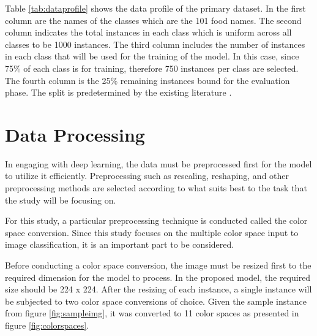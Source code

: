 Table \ref{tab:dataprofile} shows the data profile of the primary dataset. In the first column are the names of the classes which are the 101 food names. The second column indicates the total instances in each class which is uniform across all classes to be 1000 instances. The third column includes the number of instances in each class that will be used for the training of the model. In this case, since 75\% of each class is for training, therefore 750 instances per class are selected. The fourth column is the 25\%  remaining instances bound for the evaluation phase. The split is predetermined by the existing literature \cite{bossard-2014}. 



\section{Data Processing}
In engaging with deep learning, the data must be preprocessed first for the model to utilize it efficiently. Preprocessing such as rescaling, reshaping, and other preprocessing methods are selected according to what suits best to the task that the study will be focusing on.

For this study, a particular preprocessing technique is conducted called the color space conversion. Since this study focuses on the multiple color space input to image classification, it is an important part to be considered.

Before conducting a color space conversion, the image must be resized first to the required dimension for the model to process. In the proposed model, the required size should be 224 x 224. After the resizing of each instance, a single instance will be subjected to two color space conversions of choice. Given the sample instance from figure \ref{fig:sampleimg}, it was converted to 11 color spaces as presented in figure \ref{fig:colorspaces}. 

